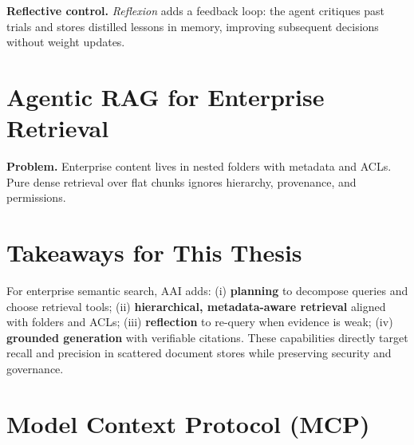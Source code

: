 \textbf{Reflective control.} \emph{Reflexion} adds a feedback loop: the agent critiques past trials and stores distilled lessons in memory, improving subsequent decisions without weight updates.

\section{Agentic RAG for Enterprise Retrieval}
\textbf{Problem.} Enterprise content lives in nested folders with metadata and ACLs. Pure dense retrieval over flat chunks ignores hierarchy, provenance, and permissions.

\section{Takeaways for This Thesis}
For enterprise semantic search, \ac{AAI} adds:
(i) \textbf{planning} to decompose queries and choose retrieval tools;
(ii) \textbf{hierarchical, metadata-aware retrieval} aligned with folders and ACLs;
(iii) \textbf{reflection} to re-query when evidence is weak;
(iv) \textbf{grounded generation} with verifiable citations. 
These capabilities directly target recall and precision in scattered document stores while preserving security and governance.

\section{Model Context Protocol (MCP)}

